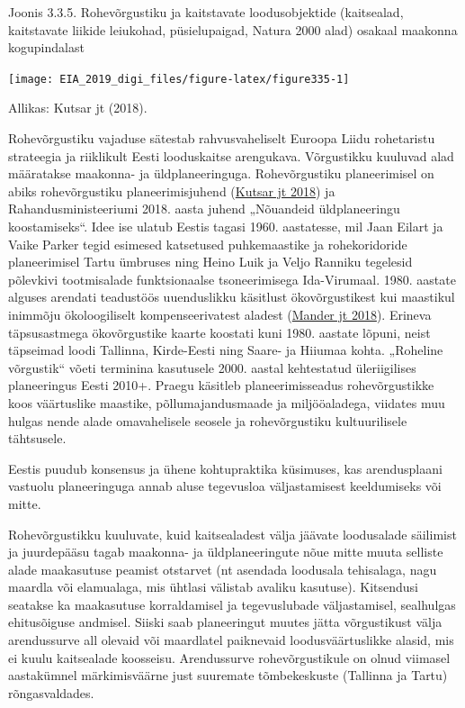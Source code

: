 \documentclass[estonian,]{article}
\begin{document}
{Joonis 3.3.5.} Rohevõrgustiku ja kaitstavate loodusobjektide (kaitsealad, kaitstavate liikide leiukohad, püsielupaigad, Natura 2000 alad) osakaal maakonna kogupindalast

\begin{center}\texttt{[image: EIA\_2019\_digi\_files/figure-latex/figure335-1]} \end{center}

\begin{imgsource}
{Allikas:} Kutsar jt (2018).
\end{imgsource}

Rohevõrgustiku vajaduse sätestab rahvusvaheliselt Euroopa Liidu rohetaristu strateegia ja riiklikult Eesti looduskaitse arengukava. Võrgustikku kuuluvad alad määratakse maakonna- ja üldplaneeringuga. Rohevõrgustiku planeerimisel on abiks rohevõrgustiku planeerimisjuhend (\protect\hyperlink{Kutsar2018}{Kutsar jt 2018}) ja Rahandusministeeriumi 2018. aasta juhend „Nõuandeid üldplaneeringu koostamiseks``. Idee ise ulatub Eestis tagasi 1960. aastatesse, mil Jaan Eilart ja Vaike Parker tegid esimesed katsetused puhkemaastike ja rohekoridoride planeerimisel Tartu ümbruses ning Heino Luik ja Veljo Ranniku tegelesid põlevkivi tootmisalade funktsionaalse tsoneerimisega Ida-Virumaal. 1980. aastate alguses arendati teadustöös uuenduslikku käsitlust ökovõrgustikest kui maastikul inimmõju ökoloogiliselt kompenseerivatest aladest (\protect\hyperlink{Mander2018}{Mander jt 2018}). Erineva täpsusastmega ökovõrgustike kaarte koostati kuni 1980. aastate lõpuni, neist täpseimad loodi Tallinna, Kirde-Eesti ning Saare- ja Hiiumaa kohta. „Roheline võrgustik`` võeti terminina kasutusele 2000. aastal kehtestatud üleriigilises planeeringus Eesti 2010+. Praegu käsitleb planeerimisseadus rohevõrgustikke koos väärtuslike maastike, põllumajandusmaade ja miljööaladega, viidates muu hulgas nende alade omavahelisele seosele ja rohevõrgustiku kultuurilisele tähtsusele.

\begin{blockquote-right}
Eestis puudub konsensus ja ühene kohtupraktika küsimuses, kas
arendusplaani vastuolu planeeringuga annab aluse tegevusloa
väljastamisest keeldumiseks või mitte.
\end{blockquote-right}

Rohevõrgustikku kuuluvate, kuid kaitsealadest välja jäävate loodusalade säilimist ja juurdepääsu tagab maakonna- ja üldplaneeringute nõue mitte muuta selliste alade maakasutuse peamist otstarvet (nt asendada loodusala tehisalaga, nagu maardla või elamualaga, mis ühtlasi välistab avaliku kasutuse). Kitsendusi seatakse ka maakasutuse korraldamisel ja tegevuslubade väljastamisel, sealhulgas ehitusõiguse andmisel. Siiski saab planeeringut muutes jätta võrgustikust välja arendussurve all olevaid või maardlatel paiknevaid loodusväärtuslikke alasid, mis ei kuulu kaitsealade koosseisu. Arendussurve rohevõrgustikule on olnud viimasel aastakümnel märkimisväärne just suuremate tõmbekeskuste (Tallinna ja Tartu) rõngasvaldades.
\end{document}
